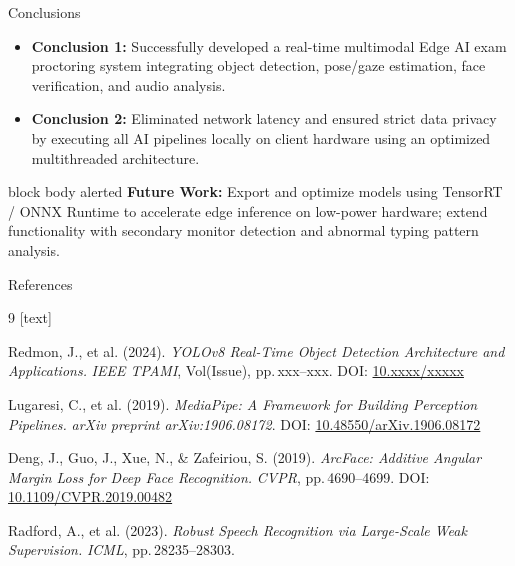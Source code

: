 \documentclass[aspectratio=169, 10pt]{beamer}
\begin{document}
\begin{frame}{Conclusions}
  \footnotesize %
  \begin{itemize}
    \setlength{\itemsep}{0.5em}
    \item \textbf{Conclusion 1:} Successfully developed a real-time multimodal Edge AI exam proctoring system integrating object detection, pose/gaze estimation, face verification, and audio analysis.
    \item \textbf{Conclusion 2:} Eliminated network latency and ensured strict data privacy by executing all AI pipelines locally on client hardware using an optimized multithreaded architecture.
  \end{itemize}

  \vspace{1em}
  \begin{beamercolorbox}[wd=\textwidth, rounded=true, sep=7pt]{block body alerted}
    \textbf{\textcolor{MLIOTblue}{Future Work:}}
    \textcolor{MLIOTink}{\footnotesize Export and optimize models using TensorRT / ONNX Runtime to accelerate edge inference on low-power hardware; extend functionality with secondary monitor detection and abnormal typing pattern analysis.}
  \end{beamercolorbox}
\end{frame}

\begin{frame}{References}
  \begin{thebibliography}{9}
    [text]

    Redmon, J., et al. (2024).
    \textit{YOLOv8 Real-Time Object Detection Architecture and Applications.}
    \textit{IEEE TPAMI}, Vol(Issue), pp.\,xxx--xxx.
    DOI: \href{https://doi.org/10.xxxx/xxxxx}{10.xxxx/xxxxx}

    Lugaresi, C., et al. (2019).
    \textit{MediaPipe: A Framework for Building Perception Pipelines.}
    \textit{arXiv preprint arXiv:1906.08172}.
    DOI: \href{https://doi.org/10.48550/arXiv.1906.08172}{10.48550/arXiv.1906.08172}

    Deng, J., Guo, J., Xue, N., \& Zafeiriou, S. (2019).
    \textit{ArcFace: Additive Angular Margin Loss for Deep Face Recognition.}
    \textit{CVPR}, pp.\,4690--4699.
    DOI: \href{https://doi.org/10.1109/CVPR.2019.00482}{10.1109/CVPR.2019.00482}

    Radford, A., et al. (2023).
    \textit{Robust Speech Recognition via Large-Scale Weak Supervision.}
    \textit{ICML}, pp.\,28235--28303.

  \end{thebibliography}
\end{frame}
\end{document}
